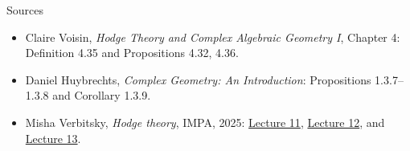\documentclass[aspectratio=169,11pt]{beamer}
\begin{document}
\begin{frame}{Sources}
\begin{itemize}
\item Claire Voisin, \emph{Hodge Theory and Complex Algebraic Geometry I},
Chapter 4: Definition 4.35 and Propositions 4.32, 4.36.
\item Daniel Huybrechts, \emph{Complex Geometry: An Introduction}:
Propositions 1.3.7--1.3.8 and Corollary 1.3.9.
\item Misha Verbitsky, \emph{Hodge theory}, IMPA, 2025:
\href{http://verbit.ru/IMPA/Kahler-2025/slides-Kahler-2025-11.pdf}{Lecture 11},
\href{http://verbit.ru/IMPA/Kahler-2025/slides-Kahler-2025-12.pdf}{Lecture 12},
and \href{http://verbit.ru/IMPA/Kahler-2025/slides-Kahler-2025-13.pdf}{Lecture 13}.
\end{itemize}
\end{frame}
\end{document}
